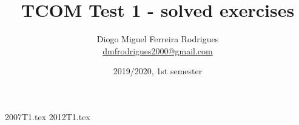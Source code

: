 \documentclass[a4paper]{article}
\title{TCOM Test 1 - solved exercises}
\author{Diogo Miguel Ferreira Rodrigues \\ \href{mailto:dmfrodrigues2000@gmail.com}{dmfrodrigues2000@gmail.com}}
\date{2019/2020, 1st semester}
\begin{document}
\begingroup
	\maketitle
	\let\clearpage\relax
	\setcounter{tocdepth}{2}
	\tableofcontents
\endgroup
\setcounter{section}{6}
{2007T1.tex}
{2012T1.tex}
\end{document}
